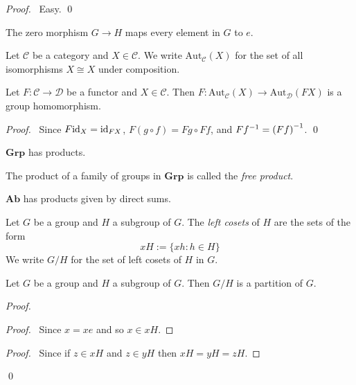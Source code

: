 \begin{proof}
\pf\ Easy. \qed
\end{proof}

The zero morphism $G \rightarrow H$ maps every element in $G$ to $e$.

\begin{df}
Let $\mathcal{C}$ be a category and $X \in \mathcal{C}$. We write $\mathrm{Aut}_\mathcal{C}(X)$ for the set of all isomorphisms $X \cong X$ under composition.
\end{df}

\begin{prop}
Let $F : \mathcal{C} \rightarrow \mathcal{D}$ be a functor and $X \in \mathcal{C}$. Then $F : \mathrm{Aut}_\mathcal{C}(X) \rightarrow \mathrm{Aut}_\mathcal{D}(FX)$ is a group homomorphism.
\end{prop}

\begin{proof}
\pf\ Since $F \mathrm{id}_{X} = \mathrm{id}_{FX}$, $F(g \circ f) = Fg \circ Ff$, and $F {f}^{-1} = {(Ff)}^{-1}$. \qed
\end{proof}

\begin{prop}
$\mathbf{Grp}$ has products.
\end{prop}

\begin{df}
The product of a family of groups in $\mathbf{Grp}$ is called the \emph{free product}.
\end{df}

\begin{prop}
$\mathbf{Ab}$ has products given by direct sums.
\end{prop}

\begin{df}
Let $G$ be a group and $H$ a subgroup of $G$. The \emph{left cosets} of $H$ are the sets of the form
\[ xH := \{ xh : h \in H \} \]
We write $G/H$ for the set of left cosets of $H$ in $G$.
\end{df}

\begin{prop}
Let $G$ be a group and $H$ a subgroup of $G$. Then $G/H$ is a partition of $G$.
\end{prop}

\begin{proof}
\pf
{}
\begin{proof}
	\pf\ Since $x = xe$ and so $x \in xH$.
\end{proof}
\begin{proof}
	\pf\ Since if $z \in xH$ and $z \in yH$ then $xH = yH = zH$.
\end{proof}
\qed
\end{proof}

